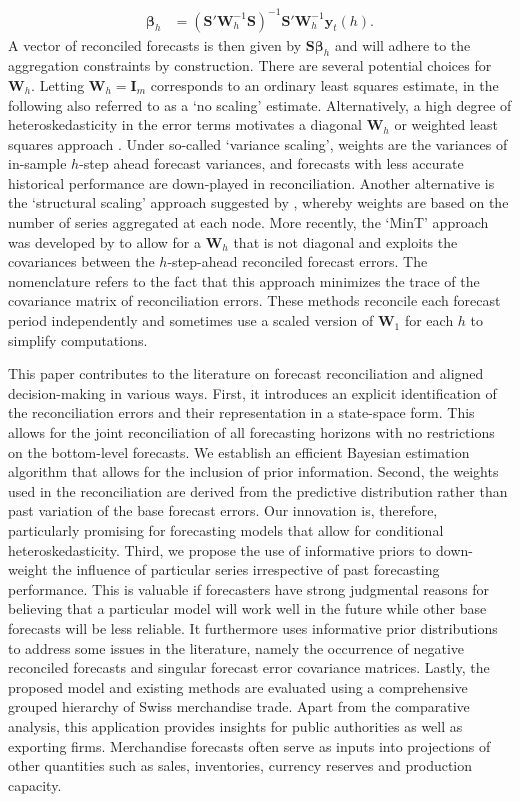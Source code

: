 \documentclass[a4paper,fleqn,11pt]{article}
\begin{document}
\begin{align}
\label{eq:reg}
\boldsymbol{\beta}_{h} &= \left(\textbf{S}'\textbf{W}_h^{-1}\textbf{S} \right)^{-1} \textbf{S}'\textbf{W}_h^{-1}\textbf{y}_t(h).
\end{align}
A vector of reconciled forecasts is then given by $\textbf{S} \boldsymbol{\beta}_{h}$ and will adhere to the aggregation constraints by construction. There are several potential choices for $\textbf{W}_h$. Letting $\textbf{W}_h = \textbf{I}_m$ corresponds to an ordinary least squares estimate, in the following also referred to as a `no scaling' estimate. Alternatively, a high degree of heteroskedasticity in the error terms motivates a diagonal $\textbf{W}_h$ or weighted least squares approach \citep{Hyndman2016}. Under so-called `variance scaling', weights are the variances of in-sample $h$-step ahead forecast variances, and forecasts with less accurate historical performance are down-played in reconciliation. Another alternative is the `structural scaling' approach suggested by \cite{Athanasopoulos2017}, whereby weights are based on the number of series aggregated at each node. More recently, the `MinT' approach was developed by \cite{Wickramasuriya2015} to allow for a $\textbf{W}_h$ that is not diagonal and exploits the covariances between the $h$-step-ahead reconciled forecast errors. The nomenclature refers to the fact that this approach minimizes the trace of the covariance matrix of reconciliation errors. These methods reconcile each forecast period independently and sometimes use a scaled version of $\textbf{W}_1$ for each $h$ to simplify computations.

This paper contributes to the literature on forecast reconciliation and aligned decision-making in various ways. First, it introduces an explicit identification of the reconciliation errors and their representation in a state-space form. This allows for the joint reconciliation of all forecasting horizons with no restrictions on the bottom-level forecasts. We establish an efficient Bayesian estimation algorithm that allows for the inclusion of prior information. Second, the weights used in the reconciliation are derived from the predictive distribution rather than past variation of the base forecast errors. Our innovation is, therefore, particularly promising for forecasting models that allow for conditional heteroskedasticity. Third, we propose the use of informative priors to down-weight the influence of particular series irrespective of past forecasting performance. This is valuable if forecasters have strong judgmental reasons for believing that a particular model will work well in the future while other base forecasts will be less reliable. It furthermore uses informative prior distributions to address some issues in the literature, namely the occurrence of negative reconciled forecasts and singular forecast error covariance matrices. Lastly, the proposed model and existing methods are evaluated using a comprehensive grouped hierarchy of Swiss merchandise trade. Apart from the comparative analysis, this application provides insights for public authorities as well as exporting firms. Merchandise forecasts often serve as inputs into projections of other quantities such as sales, inventories, currency reserves and production capacity.
\end{document}
